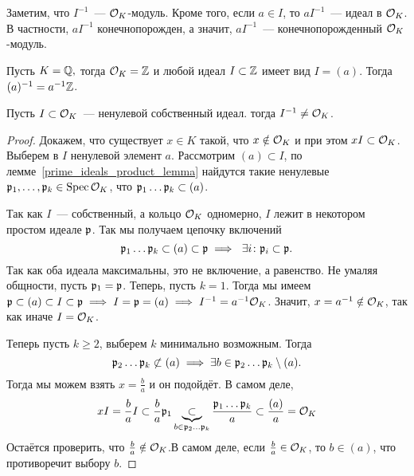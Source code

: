 	\begin{remark}
		Заметим, что $I^{-1}$~--- $\mathcal{O}_{K}$-модуль. Кроме того, если $a \in I$, то $aI^{-1}$~--- идеал в $\mathcal{O}_{K}$.
		В частности, $aI^{-1}$ конечнопорожден,  а значит, $aI^{-1}$~--- конечнопорожденный $\mathcal{O}_{K}$-модуль. 
	\end{remark}

	\begin{example}
		Пусть $K = \mathbb{Q},$ тогда $\mathcal{O}_{K} = \mathbb{Z}$ и любой идеал $I \subset \mathbb{Z}$ имеет вид $I = (a)$. Тогда $(a)^{-1} = a^{-1}\mathbb{Z}$.
	\end{example}

	\begin{lemma}\label{frac_ideal_is_not_ring}
		Пусть $I \subset \mathcal{O}_{K}$~--- ненулевой собственный идеал. тогда $I^{-1} \neq \mathcal{O}_{K}$.
	\end{lemma}

	\begin{proof}
		Докажем, что существует $x \in K$ такой, что $x \notin \mathcal{O}_{K}$ и при этом $xI \subset \mathcal{O}_{K}$.
		Выберем в $I$ ненулевой элемент $a$. Рассмотрим $(a) \subset I$, по лемме~\ref{prime_ideals_product_lemma} найдутся такие ненулевые 
		$\mathfrak{p}_{1}, \ldots, \mathfrak{p}_{k} \in \operatorname{Spec}{\mathcal{O}_{K}}$, что $\mathfrak{p}_{1}\ldots\mathfrak{p}_{k} \subset (a)$. 

		Так как $I$~--- собственный, а кольцо $\mathcal{O}_{K}$ одномерно, $I$ лежит в некотором простом идеале $\mathfrak{p}$. Так мы получаем цепочку включений 
		\[
			\mathfrak{p}_{1}\ldots \mathfrak{p}_{k} \subset (a) \subset \mathfrak{p} \implies \ \exists i\colon \mathfrak{p}_{i} \subset \mathfrak{p}.
 		\]
 		Так как оба идеала максимальны, это не включение, а равенство. Не умаляя общности, пусть $\mathfrak{p}_{1} = \mathfrak{p}$. Теперь, пусть $k = 1$. 
 		Тогда мы имеем $\mathfrak{p} \subset (a) \subset  I \subset \mathfrak{p} \implies I = \mathfrak{p} = (a) \implies I^{-1} = a^{-1}\mathcal{O}_{K}$. 
 		Значит, $x = a^{-1} \notin \mathcal{O}_{K}$, так как иначе $I = \mathcal{O}_{K}$. 

 		Теперь пусть $k \ge 2$, выберем $k$ минимально возможным.  Тогда 
 		\[
 			\mathfrak{p}_{2}  \ldots \mathfrak{p}_{k} \not\subset (a) \implies \exists b \in \mathfrak{p}_{2}\ldots \mathfrak{p}_{k} \setminus (a).
 		\]
 		Тогда мы можем взять $x = \frac{b}{a}$ и он подойдёт. В самом деле, 
 		 \[  
			xI = \frac{b}{a}I \subset \frac{b}{a}\mathfrak{p}_{1} \underbrace{\subset}_{b \in \mathfrak{p}_{2}\ldots\mathfrak{p}_{k}} \frac{\mathfrak{p}_{1}\ldots \mathfrak{p}_{k}}{a} \subset \frac{(a)}{a} = \mathcal{O}_{K}
		\]		
			 Остаётся проверить, что $\frac{b}{a} \notin \mathcal{O}_{K}$.В самом деле, если $\frac{b}{a} \in \mathcal{O}_{K}$, то $b \in (a)$, что противоречит выбору $b$.
	\end{proof}

